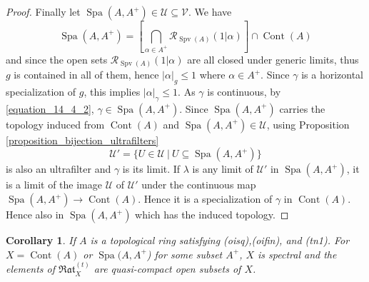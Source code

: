 \documentclass[8pt]{article}
\numberwithin{equation}{section}
\newtheorem{corollary}{Corollary} [subsection]
\DeclareMathOperator{\Spa}{Spa}
\DeclareMathOperator{\Spv}{Spv}
\DeclareMathOperator{\Cont}{Cont}
\newcommand{\U}[0]{\mathcal{U}}
\newcommand{\cR}[0]{\mathcal{R}}
\newcommand{\sep}[0]{\:|\:}
\newcommand{\ab}[1]{\vert #1 \vert}
\newcommand{\cV}[0]{\mathcal{V}}
\newcommand{\Rat}[0]{\mathfrak{Rat}}
\begin{document}
\begin{proof}
    \par Finally let $\Spa(A,A^+)\in\U\subseteq\cV$. We have 
    \begin{equation}
        \Spa(A,A^+)=\left[\bigcap_{\alpha\in A^+}\cR_{\Spv(A)}(1|\alpha)\right]\cap\Cont(A)
        \label{equation_14_4_2}
    \end{equation}
    and since the open sets $\cR_{\Spv(A)}(1|\alpha)$ are all closed under generic limits, thus $g$ is contained in all of them, hence $\ab{\alpha}_g\leq1$ where $\alpha\in A^+$. Since $\gamma$ is a horizontal specialization of $g$, this implies $\ab{\alpha}_\gamma\leq1$. As $\gamma$ is continuous, by \eqref{equation_14_4_2}, $\gamma\in\Spa(A,A^+)$.%
    Since $\Spa(A,A^+)$ carries the topology induced from $\Cont(A)$ and $\Spa(A,A^+)\in\U$, using Proposition \ref{proposition_bijection_ultrafilters} 
    \begin{equation*}
        \U' =\{U\in\U\sep U\subseteq \Spa(A,A^+)\}
    \end{equation*}
    is also an ultrafilter and $\gamma$ is its limit.
    If $\lambda$ is any limit of $\U'$ in $\Spa(A,A^+)$, it is a limit of the image $\U$ of $\U'$ under the continuous map $\Spa(A,A^+)\to \Cont(A)$. Hence it is a specialization of $\gamma$ in $\Cont(A)$. Hence also in $\Spa(A,A^+)$ which has the induced topology.
\end{proof}
\begin{corollary}
    \label{corollary_14_2}
    If $A$ is a topological ring satisfying (oisq),(oifin), and (tn1). For $X=\Cont(A)$ or $\Spa(A,A^+$) for some subset $A^+$, $X$ is spectral and the elements of $\Rat_X^{(t)}$ are quasi-compact open subsets of $X$.
\end{corollary}
\end{document}
